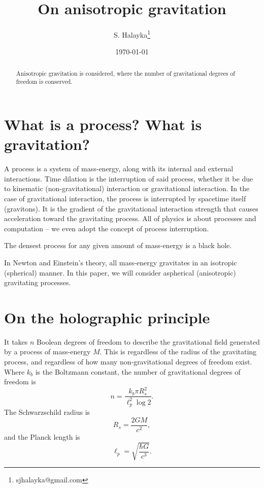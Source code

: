 \documentclass[12pt]{article}
\title{On anisotropic gravitation}
\author{S. Halayka\footnote{sjhalayka@gmail.com}}
\date{\today}
\begin{document}
 
\maketitle

\begin{abstract}
Anisotropic gravitation is considered, where the number of gravitational degrees of freedom is conserved.
\end{abstract}






\section{What is a process? What is gravitation?}

A process is a system of mass-energy, along with its internal and external interactions.
Time dilation is the interruption of said process, whether it be due to kinematic (non-gravitational) interaction or gravitational interaction.
In the case of gravitational interaction, the process is interrupted by spacetime itself (gravitons).
It is the gradient of the gravitational interaction strength that causes acceleration toward the gravitating process.
All of physics is about processes and computation -- we even adopt the concept of process interruption.

The densest process for any given amount of mass-energy is a black hole.

In Newton and Einstein's theory, all mass-energy gravitates in an isotropic (spherical) manner.
In this paper, we will consider aspherical (anisotropic) gravitating processes.


\section{On the holographic principle}

It takes $n$ Boolean degrees of freedom to describe the gravitational field \cite{hooft, susskind} generated by a process of mass-energy $M$.
This is regardless of the radius of the gravitating process, and regardless of how many non-gravitational degrees of freedom exist.
Where $k_b$ is the Boltzmann constant, the number of gravitational degrees of freedom is
\begin{equation}
n = \frac{k_b \pi R_s^2}{ \ell_p^2 \log 2}.
\end{equation}
The Schwarzschild radius is
\begin{equation}
R_s = \frac{2GM}{c^2},
\end{equation}
and the Planck length is
\begin{equation}
\ell_p = \sqrt{\frac{\hbar G}{c^3}}.
\end{equation}
\end{document}
